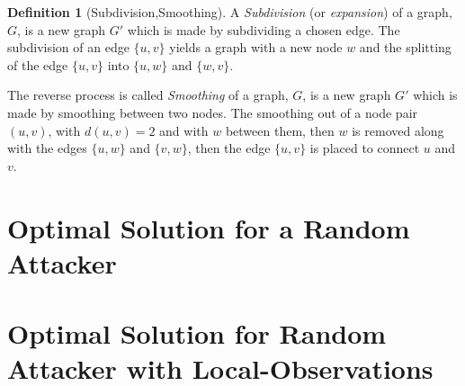 \documentclass[a4paper,10pt]{article}
\theoremstyle{definition}
\newtheorem{definition}[theorem]{Definition}
\theoremstyle{definition}
\theoremstyle{remark}
\theoremstyle{definition}
\begin{document}
\begin{definition}[Subdivision,Smoothing]
A \textit{Subdivision} (or \textit{expansion}) of a graph, $G$, is a new graph $G'$ which is made by subdividing a chosen edge. The subdivision of an edge $\{u,v\}$ yields a graph with a new node $w$ and the splitting of the edge $\{u,v\}$ into $\{u,w\}$ and $\{w,v\}$.

The reverse process is called \textit{Smoothing} of a graph, $G$, is a new graph $G'$ which is made by smoothing between two nodes. The smoothing out of a node pair $(u,v)$, with $d(u,v)=2$ and with $w$ between them, then $w$ is removed along with the edges $\{u,w\}$ and $\{v,w\}$, then the edge $\{u,v\}$ is placed to connect $u$ and $v$. 
\end{definition}

\begin{myfigure}
\begin{center}
\caption{Subdivision and Smoothing of the edge $\{1,2\}$}
\end{center}
\end{myfigure}

\section{Optimal Solution for a Random Attacker}
\label{Appendix:Optimal Solution for a Random Attacker}

\section{Optimal Solution for Random Attacker with Local-Observations}
\label{Appendix:Optimal Solution for Random Attacker with Local-Observations}
\end{document}
